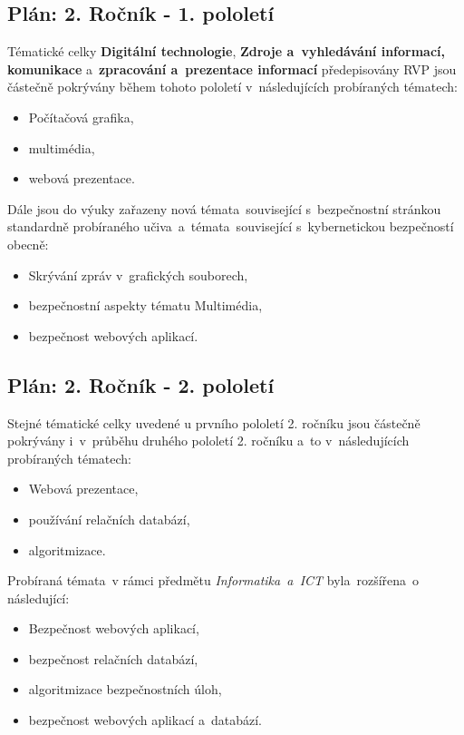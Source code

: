 \documentclass[a4paper, 12pt]{article}
\begin{document}
\subsection{Plán: 2. Ročník - 1. pololetí}
Tématické celky \textbf{Digitální technologie}, \textbf{Zdroje a~vyhledávání informací, komunikace} a~\textbf{zpracování a~prezentace informací} předepisovány RVP jsou částečně pokrývány během tohoto pololetí v~následujících probíraných tématech:
\begin{itemize}
    \setlength{\itemsep}{-3pt}
    \item Počítačová grafika,
    \item multimédia,
    \item webová prezentace.
\end{itemize}

Dále jsou do výuky zařazeny nová témata~související s~bezpečnostní stránkou standardně probíraného učiva~a~témata~související s~kybernetickou bezpečností obecně:
\begin{itemize}
    \setlength{\itemsep}{-3pt}
    \item Skrývání zpráv v~grafických souborech,
    \item bezpečnostní aspekty tématu Multimédia,
    \item bezpečnost webových aplikací.
\end{itemize}

\subsection{Plán: 2. Ročník - 2. pololetí}
Stejné tématické celky uvedené u prvního pololetí 2. ročníku jsou částečně pokrývány i~v~průběhu druhého pololetí 2. ročníku a~to v~následujících probíraných tématech:
\begin{itemize}
    \setlength{\itemsep}{-3pt}
    \item Webová prezentace,
    \item používání relačních databází,
    \item algoritmizace.
\end{itemize}

Probíraná témata~v rámci předmětu \textit{Informatika~a~ICT} byla~rozšířena~o následující:
\begin{itemize}
    \setlength{\itemsep}{-3pt}
    \item Bezpečnost webových aplikací,
    \item bezpečnost relačních databází,
    \item algoritmizace bezpečnostních úloh,
    \item bezpečnost webových aplikací a~databází.
\end{itemize}
\end{document}
